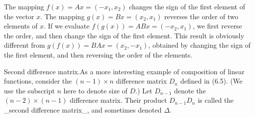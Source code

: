 The mapping \(f(x)=Ax=(-x_{1},x_{2})\) changes the sign of the first element of the vector \(x\). The mapping \(g(x)=Bx=(x_{2},x_{1})\) reverses the order of two elements of \(x\). If we evaluate \(f(g(x))=ABx=(-x_{2},x_{1})\), we first reverse the order, and then change the sign of the first element. This result is obviously different from \(g(f(x))=BAx=(x_{2},-x_{1})\), obtained by changing the sign of the first element, and then reversing the order of the elements.

Second difference matrix.As a more interesting example of composition of linear functions, consider the \((n-1)\times n\) difference matrix \(D_{n}\) defined in (6.5). (We use the subscript \(n\) here to denote size of \(D\).) Let \(D_{n-1}\) denote the \((n-2)\times(n-1)\) difference matrix. Their product \(D_{n-1}D_{n}\) is called the _second difference matrix_, and sometimes denoted \(\Delta\).

 